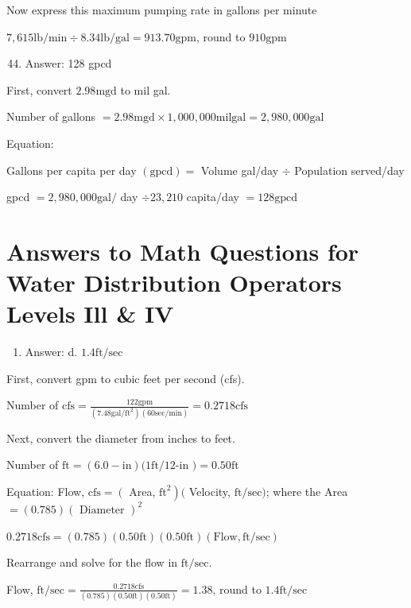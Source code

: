\documentclass[10pt]{article}
\begin{document}
Now express this maximum pumping rate in gallons per minute

$7,615 \mathrm{lb} / \mathrm{min} \div 8.34 \mathrm{lb} / \mathrm{gal}=913.70 \mathrm{gpm}$, round to $910 \mathrm{gpm}$

\begin{enumerate}
  \setcounter{enumi}{43}
  \item Answer: 128 gpcd
\end{enumerate}

First, convert $2.98 \mathrm{mgd}$ to mil gal.

Number of gallons $=2.98 \mathrm{mgd} \times 1,000,000 \mathrm{mil} \mathrm{gal}=2,980,000 \mathrm{gal}$

Equation:

Gallons per capita per day $(\mathrm{gpcd})=$ Volume gal/day $\div$ Population served/day

gpcd $=2,980,000 \mathrm{gal} /$ day $\div 23,210$ capita/day $=128 \mathrm{gpcd}$

\section{Answers to Math Questions for Water Distribution Operators Levels Ill \& IV}
\begin{enumerate}
  \item Answer: d. $1.4 \mathrm{ft} / \mathrm{sec}$
\end{enumerate}

First, convert gpm to cubic feet per second (cfs).

Number of $\mathrm{cfs}=\frac{122 \mathrm{gpm}}{\left(7.48 \mathrm{gal} / \mathrm{ft}^{2}\right)(60 \mathrm{sec} / \mathrm{min})}=0.2718 \mathrm{cfs}$

Next, convert the diameter from inches to feet.

Number of $\mathrm{ft}=(6.0-\mathrm{in})(1 \mathrm{ft} / 12$-in $)=0.50 \mathrm{ft}$

Equation: Flow, $\mathrm{cfs}=\left(\right.$ Area, $\left.\mathrm{ft}^{2}\right)($ Velocity, $\mathrm{ft} / \mathrm{sec})$; where the Area $=(0.785)(\text { Diameter })^{2}$

$0.2718 \mathrm{cfs}=(0.785)(0.50 \mathrm{ft})(0.50 \mathrm{ft})(\mathrm{Flow}, \mathrm{ft} / \mathrm{sec})$

Rearrange and solve for the flow in $\mathrm{ft} / \mathrm{sec}$.

Flow, $\mathrm{ft} / \mathrm{sec}=\frac{0.2718 \mathrm{cfs}}{(0.785)(0.50 \mathrm{ft})(0.50 \mathrm{ft})}=1.38$, round to $1.4 \mathrm{ft} / \mathrm{sec}$
\end{document}
